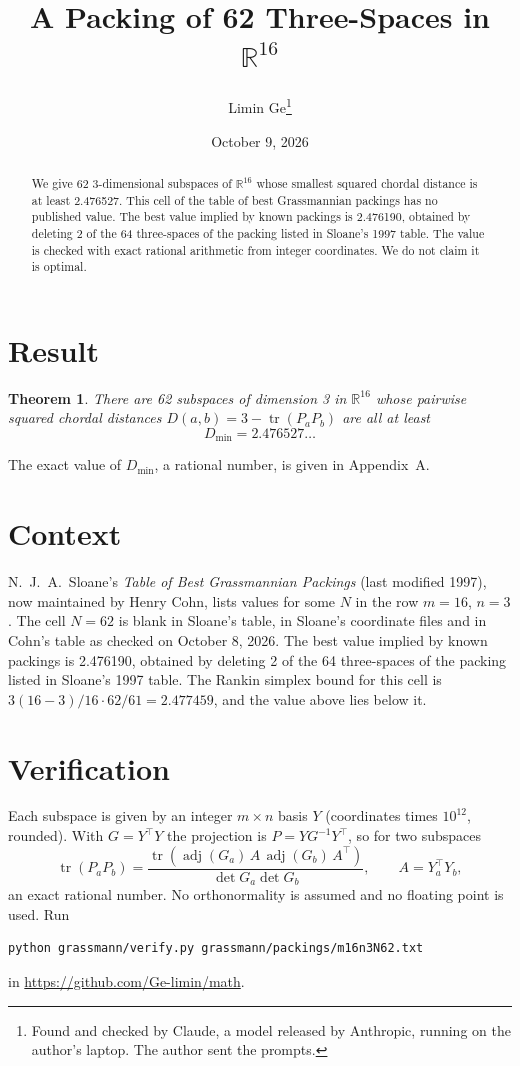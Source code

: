 \documentclass[11pt,a4paper]{article}
\title{A Packing of 62 Three-Spaces in $\mathbb{R}^{16}$}
\author{Limin Ge\thanks{Found and checked by Claude, a model released by Anthropic, running on the author's laptop. The author sent the prompts.}}
\date{October 9, 2026}
\newtheorem*{theorem}{Theorem}
\begin{document}
\maketitle
\begin{abstract}
We give 62 3-dimensional subspaces of $\mathbb{R}^{16}$ whose smallest squared chordal distance is at least 2.476527. This cell of the table of best Grassmannian packings has no published value. The best value implied by known packings is 2.476190, obtained by deleting 2 of the 64 three-spaces of the packing listed in Sloane's 1997 table. The value is checked with exact rational arithmetic from integer coordinates. We do not claim it is optimal.
\end{abstract}

\section{Result}
\begin{theorem}
There are 62 subspaces of dimension 3 in $\mathbb{R}^{16}$ whose pairwise squared chordal distances $D(a,b) = 3 - \operatorname{tr}(P_aP_b)$ are all at least
\[ D_{\min} = 2.476527\ldots \]
\end{theorem}
The exact value of $D_{\min}$, a rational number, is given in Appendix~A.


\section{Context}
N.~J.~A.~Sloane's \emph{Table of Best Grassmannian Packings} (last modified 1997), now maintained by Henry Cohn, lists values for some $N$ in the row $m=16$, $n=3$. The cell $N=62$ is blank in Sloane's table, in Sloane's coordinate files and in Cohn's table as checked on October 8, 2026. The best value implied by known packings is 2.476190, obtained by deleting 2 of the 64 three-spaces of the packing listed in Sloane's 1997 table. The Rankin simplex bound for this cell is $3(16-3)/16\cdot 62/61 = 2.477459$, and the value above lies below it.


\section{Verification}
Each subspace is given by an integer $m\times n$ basis $Y$ (coordinates times $10^{12}$, rounded). With $G=Y^\top Y$ the projection is $P=YG^{-1}Y^\top$, so for two subspaces
\[ \operatorname{tr}(P_aP_b)=\frac{\operatorname{tr}(\operatorname{adj}(G_a)\,A\,\operatorname{adj}(G_b)\,A^\top)}{\det G_a\det G_b},\qquad A=Y_a^\top Y_b, \]
an exact rational number. No orthonormality is assumed and no floating point is used. Run
\begin{verbatim}
python grassmann/verify.py grassmann/packings/m16n3N62.txt
\end{verbatim}
in \url{https://github.com/Ge-limin/math}.
\end{document}
